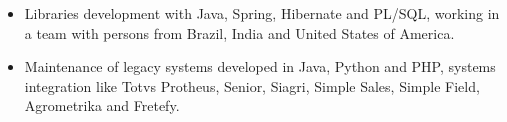 \documentclass[10pt,a4paper,ragged2e]{altacv}
\begin{document}

\begin{fullwidth}
\makecvheader
\end{fullwidth}




\begin{itemize}
  \item Libraries development with Java, Spring, Hibernate and PL/SQL, working in a team with persons from Brazil, India and United States of America.
\end{itemize}

\vspace{10px}

\begin{itemize}
  \item Maintenance of legacy systems developed in Java, Python and PHP, systems integration like Totvs Protheus, Senior, Siagri, Simple Sales, Simple Field, Agrometrika and Fretefy.
\end{itemize}

\vspace{10px}
\end{document}
